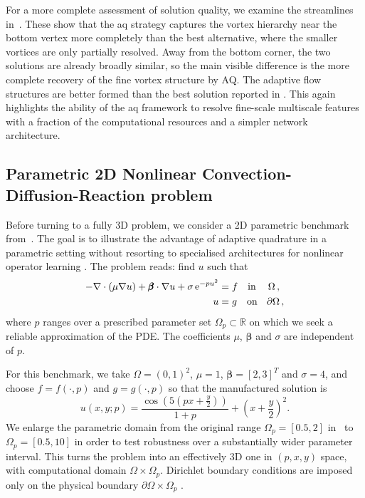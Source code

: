 \documentclass[oneside,reqno,11pt,a4paper]{amsart}
\theoremstyle{definition}
\begin{document}
For a more complete assessment of solution quality, we examine the streamlines
in~. These show that the \ac{aq} strategy
captures the vortex hierarchy near the bottom vertex more completely than the
best alternative, where the smaller vortices are only partially resolved. Away
from the bottom corner, the two solutions are already broadly similar, so the
main visible difference is the more complete recovery of the fine vortex
structure by AQ. The adaptive flow structures are 
better formed than the best solution reported in
\cite[Figure 23(a)]{KiyaniOpt2025}. This again highlights the ability of the
\ac{aq} framework to resolve fine-scale multiscale features with a fraction of
the computational resources and a simpler network architecture.

\subsection{Parametric 2D Nonlinear Convection-Diffusion-Reaction problem}
\label{sec:parametric-prob}

Before turning to a fully 3D problem, we consider a 2D parametric benchmark
from~\cite{BerroneVPINNs2022}. The goal is to
illustrate the advantage of adaptive quadrature in a parametric setting
without resorting to specialised architectures for nonlinear operator learning
\cite{DeepONet2021, FNO2021}. The problem reads: find $u$ such that 
\begin{align} \label{eq:parametric-2d-problem}
-\nabla \cdot (\mu \nabla u) + \pmb{\beta}\cdot \nabla u + \sigma\,  {\rm e}^{-pu^2} &= f \quad \text{in \;\; } \Omega\,, \\
u &= g \quad \text{on \; } \partial\Omega \,, 
\end{align}
where $p$ ranges over a prescribed parameter set
$\Omega_p \subset \mathbb R$ on which we seek a reliable approximation of the
PDE. The coefficients $\mu$, $\pmb{\beta}$ and $\sigma$ are independent of
$p$.

For this benchmark, we take $\Omega = (0,1)^2$, $\mu = 1$,
$\pmb{\beta} = [2,3]^T$ and $\sigma = 4$, and choose $f = f(\cdot,p)$ and
$g = g(\cdot,p)$ so that the manufactured solution is
\begin{equation}
u(x,y;p) = \frac{\cos\left(5\left(px+\frac y2\right)\right)}{1+p} + \left(x+\frac y2\right)^2.
\end{equation}
We enlarge the parametric domain from the original range
$\Omega_p = [0.5, 2]$ in~\cite{BerroneVPINNs2022} to $\Omega_p = [0.5, 10]$ in
order to test robustness over a substantially wider parameter interval. This turns the problem into an effectively 3D one in
$(p,x,y)$ space, with computational domain
$\Omega \times \Omega_p$. Dirichlet boundary conditions are
 imposed only on the physical boundary $\partial\Omega \times \Omega_p$ .
\end{document}
